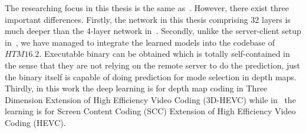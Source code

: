 The researching focus in this thesis is the same as~\parencite{RN73}.
However, there exist three important differences.
Firstly, the network in this thesis comprising 32 layers is
much deeper than the 4-layer network in~\parencite{RN73}.
Secondly, unlike the server-client setup in~\parencite{RN73}, we have
managed to integrate the learned models into the codebase of \(HTM16.2\).
Executable binary can be obtained which is totally self-contained in the
sense that they are not relying on the remote server to do the prediction,
just the binary itself is capable of doing prediction
for mode selection in depth maps.
Thirdly, in this work the deep learning is for depth map coding in
Three Dimension Extension of High Efficiency Video Coding (3D-HEVC)
while in~\parencite{RN73} the learning is for Screen Content Coding (SCC)
Extension of High Efficiency Video Coding (HEVC).





